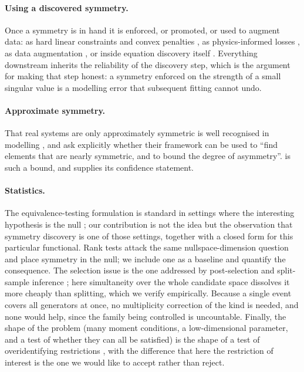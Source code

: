\paragraph{Using a discovered symmetry.} Once a symmetry is in hand it is
enforced, or promoted, or used to augment data: as hard linear constraints and
convex penalties \citep{otto2025unified}, as physics-informed losses
\citep{raissi2019physics,akhound2023lie}, as data augmentation
\citep{brandstetter2022lie}, or inside equation discovery itself
\citep{yang2024symmetry}. Everything downstream inherits the reliability of
the discovery step, which is the argument for making that step honest: a
symmetry enforced on the strength of a small singular value is a modelling
error that subsequent fitting cannot undo.

\paragraph{Approximate symmetry.} That real systems are only approximately
symmetric is well recognised in modelling \citep{wang2022approximately,
romero2022learning}, and \citet{otto2025unified} ask explicitly whether their
framework can be used to ``find elements that are nearly symmetric, and to
bound the degree of asymmetry''.  is such a bound, and
\symcert{} supplies its confidence statement.

\paragraph{Statistics.} The equivalence-testing formulation is standard in
settings where the interesting hypothesis is the null
\citep{schuirmann1987comparison,berger1996bioequivalence,wellek2010testing};
our contribution is not the idea but the observation that symmetry discovery
is one of those settings, together with a closed form for this particular
functional. Rank tests
\citep{cragg1997inferring,robin2000tests,kleibergen2006generalized} attack the
same nullspace-dimension question and place symmetry in the null; we include
one as a baseline and quantify the consequence. The selection issue is the one
addressed by post-selection and split-sample inference
\citep{berk2013valid,lee2016exact,meinshausen2009pvalues,
chernozhukov2018double,andrews2024inference}; here simultaneity over the whole
candidate space dissolves it more cheaply than splitting, which we verify
empirically. Because a single event covers all generators at once, no
multiplicity correction of the \citet{benjamini1995controlling} kind is
needed, and none would help, since the family being controlled is uncountable.
Finally, the shape of the problem (many moment conditions, a low-dimensional
parameter, and a test of whether they can all be satisfied) is the shape of a
test of overidentifying restrictions \citep{hansen1982large}, with the
difference that here the restriction of interest is the one we would like to
accept rather than reject.

